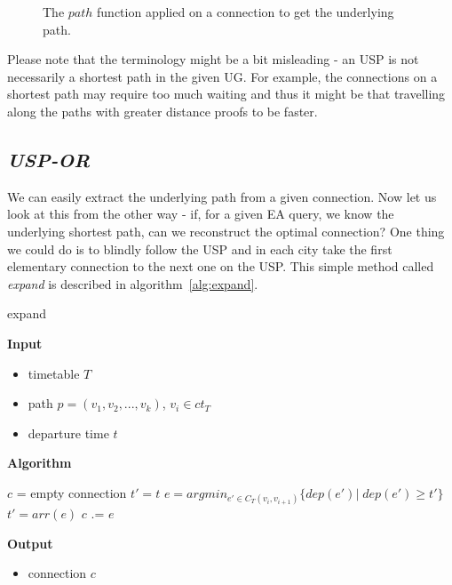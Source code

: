 \begin{figure}[h!]
	\begin{center}
	\end{center}
	\caption{\label{fig:pathfunc} The $path$ function applied on a connection to get the underlying path.}
\end{figure}

\noindent Please note that the terminology might be a bit misleading - an USP is not necessarily a shortest path in the given UG. For example, the connections on a shortest path may require too much waiting and thus it might be that travelling along the paths with greater distance proofs to be faster.
	    
\subsection{\textit{USP-OR}}

	We can easily extract the underlying path from a given connection. Now let us look at this from the other way - if, for a given EA query, we know the underlying shortest path, can we reconstruct the optimal connection? One thing we could do is to blindly follow the USP and in each city take the first elementary connection to the next one on the USP. This simple method called \textit{expand} is described in algorithm~\ref{alg:expand}. 
	
	\color{algcolor}
	\begin{algorithm}[H]
		\color{inalgcolor}
		\caption{expand}
		\label{alg:expand}
		\textbf{Input} 
		\begin{itemize}
			\item timetable $T$
			\item path $p = (v_{1}, v_{2}, ..., v_{k})$, $v_{i} \in ct_{T}$
			\item departure time $t$
		\end{itemize}
		\textbf{Algorithm}
		\begin{algorithmic}
			\STATE $c$ = empty connection
			\STATE $t' = t$
				\STATE $e = argmin_{e' \in C_{T}(v_{i}, v_{i + 1})} \{dep(e')|\; dep(e') \geq t'\}$ 
				\STATE $t' = arr(e)$
				\STATE $c$ .= $e$ 
			\ENDFOR
		\end{algorithmic}
		\textbf{Output}
		\begin{itemize}
			\item connection $c$
		\end{itemize}
	\end{algorithm}
	\color{black}	
	

